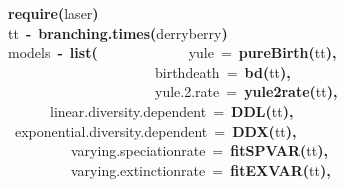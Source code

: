 \documentclass[authoryear, preprint]{elsarticle}
\makeatletter
\newcommand{\hlfunctioncall}[1]{\textcolor[rgb]{.5,0,.33}{\textbf{#1}}}%
\newcommand{\hlkeyword}[1]{\textbf{#1}}%
\newcommand{\hlargument}[1]{\textcolor[rgb]{.69,.25,.02}{#1}}%
\newcommand{\hlassignement}[1]{\textbf{#1}}%
\newcommand{\hlsymbol}[1]{#1}%
\newcommand{\hlstd}[1]{\textcolor[rgb]{0,0,0}{#1}}%
\newenvironment{kframe}{%
 \def\FrameCommand##1{\hskip\@totalleftmargin \hskip-\fboxsep
 \colorbox{shadecolor}{##1}\hskip-\fboxsep
     \hskip-\linewidth \hskip-\@totalleftmargin \hskip\columnwidth}%
 \MakeFramed {\advance\hsize-\width
   \@totalleftmargin\z@ \linewidth\hsize
   \@setminipage}}%
 {\par\unskip\endMakeFramed}
\newenvironment{knitrout}{}{} %
\makeatother
\begin{document}
\begin{knitrout}
\color{fgcolor}\begin{kframe}
\begin{flushleft}
\ttfamily\noindent
\hlfunctioncall{require}\hlkeyword{(}\hlsymbol{laser}\hlkeyword{)}\hspace*{\fill}\\
\hlstd{}\hlsymbol{tt}{\ }\hlassignement{\usebox{\hlnormalsizeboxlessthan}-}{\ }\hlfunctioncall{branching.times}\hlkeyword{(}\hlsymbol{derryberry}\hlkeyword{)}\hspace*{\fill}\\
\hlstd{}\hlsymbol{models}{\ }\hlassignement{\usebox{\hlnormalsizeboxlessthan}-}{\ }\hlfunctioncall{list}\hlkeyword{(}{\ }{\ }{\ }{\ }{\ }{\ }{\ }{\ }{\ }{\ }{\ }{\ }{\ }\hlargument{yule}{\ }\hlargument{=}{\ }\hlfunctioncall{pureBirth}\hlkeyword{(}\hlsymbol{tt}\hlkeyword{)}\hlkeyword{,}\hspace*{\fill}\\
\hlstd{}{\ }{\ }{\ }{\ }{\ }{\ }{\ }{\ }{\ }{\ }{\ }{\ }{\ }{\ }{\ }{\ }{\ }{\ }{\ }{\ }{\ }\hlargument{birth\usebox{\hlnormalsizeboxunderscore}death}{\ }\hlargument{=}{\ }\hlfunctioncall{bd}\hlkeyword{(}\hlsymbol{tt}\hlkeyword{)}\hlkeyword{,}\hspace*{\fill}\\
\hlstd{}{\ }{\ }{\ }{\ }{\ }{\ }{\ }{\ }{\ }{\ }{\ }{\ }{\ }{\ }{\ }{\ }{\ }{\ }{\ }{\ }{\ }\hlargument{yule.2.rate}{\ }\hlargument{=}{\ }\hlfunctioncall{yule2rate}\hlkeyword{(}\hlsymbol{tt}\hlkeyword{)}\hlkeyword{,}\hspace*{\fill}\\
\hlstd{}{\ }{\ }{\ }{\ }{\ }{\ }\hlargument{linear.diversity.dependent}{\ }\hlargument{=}{\ }\hlfunctioncall{DDL}\hlkeyword{(}\hlsymbol{tt}\hlkeyword{)}\hlkeyword{,}\hspace*{\fill}\\
\hlstd{}{\ }\hlargument{exponential.diversity.dependent}{\ }\hlargument{=}{\ }\hlfunctioncall{DDX}\hlkeyword{(}\hlsymbol{tt}\hlkeyword{)}\hlkeyword{,}\hspace*{\fill}\\
\hlstd{}{\ }{\ }{\ }{\ }{\ }{\ }{\ }{\ }{\ }\hlargument{varying.speciation\usebox{\hlnormalsizeboxunderscore}rate}{\ }\hlargument{=}{\ }\hlfunctioncall{fitSPVAR}\hlkeyword{(}\hlsymbol{tt}\hlkeyword{)}\hlkeyword{,}\hspace*{\fill}\\
\hlstd{}{\ }{\ }{\ }{\ }{\ }{\ }{\ }{\ }{\ }\hlargument{varying.extinction\usebox{\hlnormalsizeboxunderscore}rate}{\ }\hlargument{=}{\ }\hlfunctioncall{fitEXVAR}\hlkeyword{(}\hlsymbol{tt}\hlkeyword{)}\hlkeyword{,}\hspace*{\fill}\\

\end{flushleft}
\end{kframe}
\end{knitrout}
\end{document}
